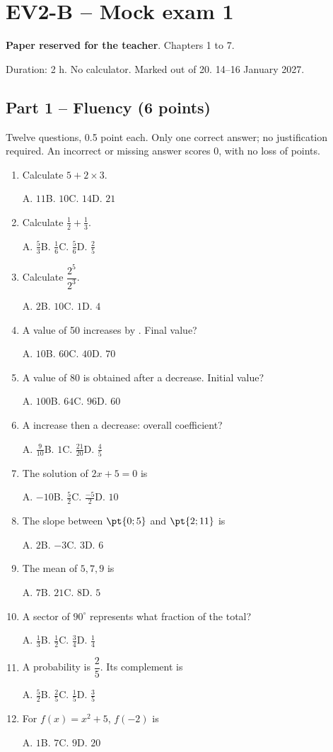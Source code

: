 \mxnewpage\section*{EV2-B -- Mock exam 1}\label{EV2-B}
\textbf{Paper reserved for the teacher}. Chapters 1 to 7.\par Duration: 2 h. No calculator. Marked out of 20. 14--16 January 2027.
\subsection*{Part 1 -- Fluency (6 points)}
Twelve questions, \num{0,5} point each. Only one correct answer; no justification required. An incorrect or missing answer scores 0, with no loss of points.
\begin{enumerate}
\item Calculate $5+2\times3$.\par A. $11$\quad B. $10$\quad C. $14$\quad D. $21$
\item Calculate $\frac12+\frac13$.\par A. $\frac{5}{3}$\quad B. $\frac{1}{6}$\quad C. $\frac{5}{6}$\quad D. $\frac{2}{5}$
\item Calculate $\dfrac{2^5}{2^{3}}$.\par A. $2$\quad B. $10$\quad C. $1$\quad D. $4$
\item A value of 50 increases by . Final value?\par A. $10$\quad B. $60$\quad C. $40$\quad D. $70$
\item A value of 80 is obtained after a  decrease. Initial value?\par A. $100$\quad B. $64$\quad C. $96$\quad D. $60$
\item A  increase then a  decrease: overall coefficient?\par A. $\frac{9}{10}$\quad B. $1$\quad C. $\frac{21}{20}$\quad D. $\frac{4}{5}$
\item The solution of $2x+5=0$ is\par A. $-10$\quad B. $\frac{5}{2}$\quad C. $\frac{-5}{2}$\quad D. $10$
\item The slope between $\pt{0;5}$ and $\pt{2;11}$ is\par A. $2$\quad B. $-3$\quad C. $3$\quad D. $6$
\item The mean of $5, 7, 9$ is\par A. $7$\quad B. $21$\quad C. $8$\quad D. $5$
\item A sector of $90^\circ$ represents what fraction of the total?\par A. $\frac{1}{3}$\quad B. $\frac{1}{2}$\quad C. $\frac{3}{4}$\quad D. $\frac{1}{4}$
\item A probability is $\dfrac{2}{5}$. Its complement is\par A. $\frac{5}{2}$\quad B. $\frac{2}{5}$\quad C. $\frac{1}{5}$\quad D. $\frac{3}{5}$
\item For $f(x)=x^2+5$, $f(-2)$ is\par A. $1$\quad B. $7$\quad C. $9$\quad D. $20$
\end{enumerate}
